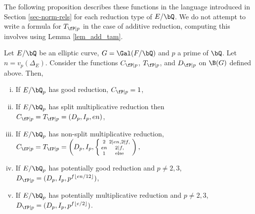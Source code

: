 The following proposition describes these functions in the language introduced in Section \ref{sec-norm-rels} for each reduction type of $E / \bQ$. We do not attempt to write a formula for $T_{\fP \mid p}$ in the case of additive reduction, computing this involves using Lemma \ref{lem_add_tam}.

\begin{prop}\label{prop_local_fns}
    Let $E / \bQ$ be an elliptic curve, $G = \Gal(F / \bQ)$ and $p$ a prime of $\bQ$. Let $n = v_p(\Delta_E)$. Consider the functions $C_{\fP \mid p}$, $T_{\fP \mid p}$, and $D_{\fP \mid p}$ on $\B(G)$ defined above. Then,
    \begin{enumerate}[(i)]
        \setlength\itemsep{0em}
        \item If $E / \bQ_p$ has good reduction, $C_{\fP \mid p} = 1$,
        \item If $E / \bQ_p$ has split multiplicative reduction then $C_{\fP \mid p} = T_{\fP \mid p} = (D_p, I_p, e n)$,
        \item If $E / \bQ_p$ has non-split multiplicative reduction, 
        $C_{\fP \mid p} = T_{\fP \mid p} = \left(D_p, I_p,
        \left\{\begin{smallmatrix}
            2   & 2 \mid en, 2 \nmid f,  \\
            en   &  2 \mid f, \\
            1   & \text{else}
        \end{smallmatrix}\right.\right),$ 
        \item If $E / \bQ_p$ has potentially good reduction and $p \not= 2, 3$, $D_{\fP \mid p} = (D_p, I_p, p^{f \floor{e n /12}})$, 
        \item If $E / \bQ_p$ has potentially multiplicative reduction and $p \not= 2, 3$, $D_{\fP \mid p} = (D_p, I_p, p^{f \floor{e / 2}})$.
    \end{enumerate}  
\end{prop} 
 
